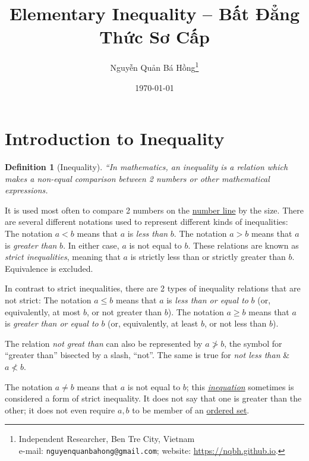 \documentclass{article}
\title{Elementary Inequality -- Bất Đẳng Thức Sơ Cấp}
\author{Nguyễn Quản Bá Hồng\footnote{Independent Researcher, Ben Tre City, Vietnam\\e-mail: \texttt{nguyenquanbahong@gmail.com}; website: \url{https://nqbh.github.io}.}}
\date{\today}
\newtheorem{definition}{Definition}
\begin{document}
\maketitle
\begin{abstract}
	
\end{abstract}
\tableofcontents
\newpage


\section{Introduction to Inequality}

\begin{definition}[Inequality]
	``In mathematics, an \emph{inequality} is a relation which makes a non-equal comparison between 2 numbers or other mathematical expressions.
\end{definition}
It is used most often to compare 2 numbers on the \href{https://en.wikipedia.org/wiki/Number_line}{number line} by the size. There are several different notations used to represent different kinds of inequalities: The notation $a < b$ means that $a$ is \textit{less than} $b$. The notation $a > b$ means that $a$ is \textit{greater than} $b$. In either case, $a$ is not equal to $b$. These relations are known as \textit{strict inequalities}, meaning that $a$ is strictly less than or strictly greater than $b$. Equivalence is excluded.

In contrast to strict inequalities, there are 2 types of inequality relations that are not strict: The notation $a\le b$ means that $a$ is \textit{less than or equal to} $b$ (or, equivalently, at most $b$, or not greater than $b$). The notation $a\ge b$ means that $a$ is \textit{greater than or equal to} $b$ (or, equivalently, at least $b$, or not less than $b$).

The relation \textit{not great than} can also be represented by $a\not > b$, the symbol for ``greater than'' bisected by a slash, ``not''. The same is true for \textit{not less than} \& $a\not < b$.

The notation $a\ne b$ means that $a$ is not equal to $b$; this \href{https://en.wikipedia.org/wiki/Inequation}{\textit{inequation}} sometimes is considered a form of strict inequality. It does not say that one is greater than the other; it does not even require $a,b$  to be member of an \href{https://en.wikipedia.org/wiki/Ordered_set}{ordered set}.
\end{document}
